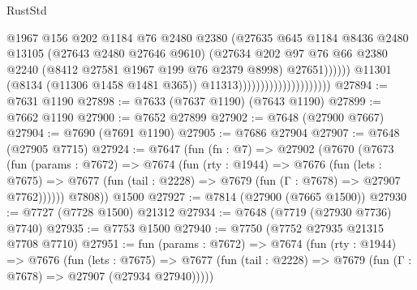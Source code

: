 \begin{lexlean}{RustStd}
\begin{coremodule}
{\begin{coremodule}
{{{{{{{{{{{{{{{{{{{{{{{{{{{{{{{{{{{{{{{{{{{{{{{{{{{{{                                                      @1967
                                                      @156
                                                      @202
                                                      @1184
                                                      @76
                                                      @2480
                                                      @2380
                                                      (@27635
                                                        @645
                                                        @1184
                                                        @8436
                                                        @2480
                                                        @13105
                                                        (@27643 @2480 @27646 @9610)
                                                        (@27634
                                                          @202
                                                          @97
                                                          @76
                                                          @66
                                                          @2380
                                                          @2240
                                                          (@8412 @27581 @1967 @199 @76 @2379 @8998)
                                                          @27651))))))
                                              @11301
                                              (@8134 (@11306 @1458 @1481 @365))
                                              @11313)))))))))))))))))))))
@27894 := @7631 @1190
@27898 := @7633 (@7637 @1190) (@7643 @1190)
@27899 := @7662 @1190
@27900 := @7652 @27899
@27902 := @7648 (@27900 @7667)
@27904 := @7690 (@7691 @1190)
@27905 := @7686 @27904
@27907 := @7648 (@27905 @7715)
@27924 := @7647
    (fun (fn : @7) =>
    @27902
      (@7670
        (@7673
          (fun (params : @7672) =>
          @7674
            (fun (rty : @1944) =>
            @7676
              (fun (lets : @7675) =>
              @7677 (fun (tail : @2228) => @7679 (fun (Γ : @7678) => @27907 @7762))))))
        @7808))
    @1500
@27927 := @7814 (@27900 (@7665 @1500))
@27930 := @7727 (@7728 @1500) @21312
@27934 := @7648 (@7719 (@27930 @7736) @7740)
@27935 := @7753 @1500
@27940 := @7750 (@7752 @27935 @21315 @7708 @7710)
@27951 := fun (params : @7672) =>
  @7674
    (fun (rty : @1944) =>
    @7676
      (fun (lets : @7675) =>
      @7677 (fun (tail : @2228) => @7679 (fun (Γ : @7678) => @27907 (@27934 @27940)))))
}}}}}}}}}}}}}}}}}}}}}}}}}}}}}}}}}}}}}}}}}}}}}}}}}}}}}
\end{coremodule}}
\end{coremodule}
\end{lexlean}
